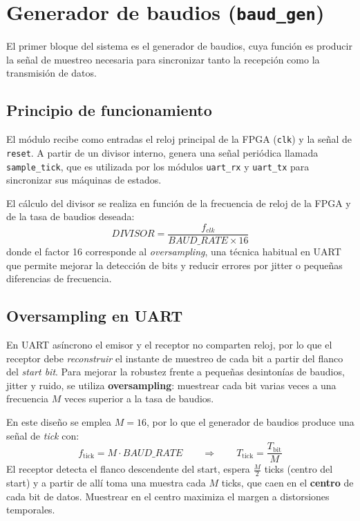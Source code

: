 \section{Generador de baudios (\texttt{baud\_gen})}

El primer bloque del sistema es el generador de baudios, cuya función es producir la señal de muestreo necesaria para sincronizar tanto la recepción como la transmisión de datos. 

\subsection{Principio de funcionamiento}
El módulo recibe como entradas el reloj principal de la FPGA (\texttt{clk}) y la señal de \texttt{reset}. 
A partir de un divisor interno, genera una señal periódica llamada \texttt{sample\_tick}, que es utilizada por los módulos \texttt{uart\_rx} y \texttt{uart\_tx} para sincronizar sus máquinas de estados.

El cálculo del divisor se realiza en función de la frecuencia de reloj de la FPGA y de la tasa de baudios deseada:
\[
DIVISOR = \frac{f_{clk}}{BAUD\_RATE \times 16}
\]
donde el factor 16 corresponde al \textit{oversampling}, una técnica habitual en UART que permite mejorar la detección de bits y reducir errores por jitter o pequeñas diferencias de frecuencia.

\subsection{Oversampling en UART}

En UART asíncrono el emisor y el receptor no comparten reloj, por lo que el receptor debe \emph{reconstruir} el instante de muestreo de cada bit a partir del flanco del \emph{start bit}. Para mejorar la robustez frente a pequeñas desintonías de baudios, jitter y ruido, se utiliza \textbf{oversampling}: muestrear cada bit varias veces a una frecuencia $M$ veces superior a la tasa de baudios.

En este diseño se emplea $M=16$, por lo que el generador de baudios produce una señal de \emph{tick} con:
\[
f_{\text{tick}} = M \cdot BAUD\_RATE \qquad \Rightarrow \qquad T_{\text{tick}} = \frac{T_{\text{bit}}}{M}
\]
El receptor detecta el flanco descendente del start, espera \(\tfrac{M}{2}\) ticks (centro del start) y a partir de allí toma una muestra cada \(M\) ticks, que caen en el \textbf{centro} de cada bit de datos. Muestrear en el centro maximiza el margen a distorsiones temporales.

